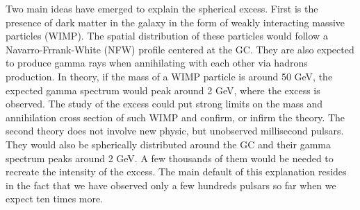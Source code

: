 Two main ideas have emerged to explain the spherical excess.
First is the presence of dark matter in the galaxy in the form of weakly interacting massive particles (WIMP). The spatial distribution of these particles would follow a Navarro-Frrank-White (NFW) profile centered at the GC. They are also expected to produce gamma rays when annihilating with each other via hadrons production. In theory, if the mass of a WIMP particle is around 50 GeV, the expected gamma spectrum would peak around 2 GeV, where the excess is observed. 
The study of the excess could put strong limits on the mass and annihilation cross section of such WIMP and confirm, or infirm the theory.
The second theory does not involve new physic, but unobserved millisecond pulsars. They would also be spherically distributed around the GC and their gamma spectrum peaks around 2 GeV. A few thousands of them would be needed to recreate the intensity of the excess. The main default of this explanation resides in the fact that we have observed only a few hundreds pulsars so far when we expect ten times more.







































